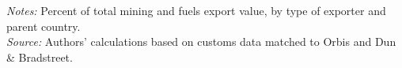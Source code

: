 \documentclass[11pt,a4paper]{article}
\begin{document}
\begin{table}[H]\centering\small%
  \caption{Mining and Fuels: Share of Total Exports, by Parent Country}%
  \label{tab:f4tn_mining}%
  \par\vspace{3pt}%
  \begin{minipage}{0.95\textwidth}\footnotesize %
  \textit{Notes:} Percent of total mining and fuels export value, by type of exporter and parent country.\\[3pt]%
  \textit{Source:} Authors' calculations based on customs data matched to Orbis and Dun \& Bradstreet.%
  \end{minipage}%
  \end{table}
\end{document}
